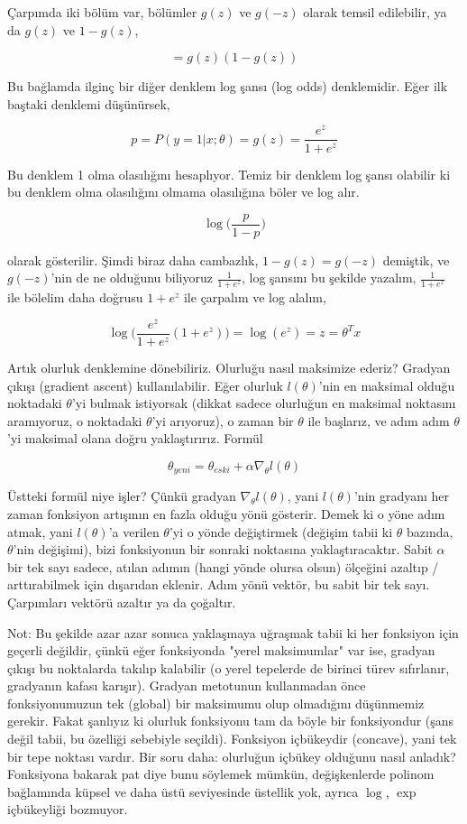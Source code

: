 \documentclass[12pt,fleqn]{article}\usepackage{../../common}
\begin{document}
Çarpımda iki bölüm var, bölümler $g(z)$ ve $g(-z)$ olarak temsil edilebilir, ya
da $g(z)$ ve $1-g(z)$,

$$
 = g(z)(1-g(z))
$$

Bu bağlamda ilginç bir diğer denklem log şansı (log odds) denklemidir. Eğer ilk
baştaki denklemi düşünürsek,

$$ p = P(y=1|x;\theta) = g(z) = \frac{e^{z}}{1+e^{z}}  $$

Bu denklem 1 olma olasılığını hesaplıyor. Temiz bir denklem log şansı olabilir
ki bu denklem olma olasılığını olmama olasılığına böler ve log alır.

$$ \log \bigg( \frac{p}{1-p} \bigg)$$

olarak gösterilir. Şimdi biraz daha cambazlık, $1 - g(z) = g(-z)$ demiştik, ve
$g(-z)$'nin de ne olduğunu biliyoruz $\frac{1}{1+e^{z}}$, log şansını bu şekilde
yazalım, $\frac{1}{1+e^{z}}$ ile bölelim daha doğrusu $1+e^{z}$ ile çarpalım ve
log alalım,

$$ 
\log \bigg( \frac{e^{z}}{1+e^{z}} (1+e^{z})  \bigg) 
= \log(e^{z}) 
= z = \theta^Tx
$$

Artık olurluk denklemine dönebiliriz. Olurluğu nasıl maksimize ederiz?  Gradyan
çıkışı (gradient ascent) kullanılabilir. Eğer olurluk $l(\theta)$'nin en
maksimal olduğu noktadaki $\theta$'yi bulmak istiyorsak (dikkat sadece olurluğun
en maksimal noktasını aramıyoruz, o noktadaki $\theta$'yi arıyoruz), o zaman bir
$\theta$ ile başlarız, ve adım adım $\theta$'yi maksimal olana doğru
yaklaştırırız. Formül

$$ \theta_{yeni} = \theta_{eski} + \alpha \nabla_\theta l(\theta)$$

Üstteki formül niye işler? Çünkü gradyan $\nabla_\theta l(\theta)$, yani
$l(\theta)$'nin gradyanı her zaman fonksiyon artışının en fazla olduğu yönü
gösterir. Demek ki o yöne adım atmak, yani $l(\theta)$'a verilen $\theta$'yi o
yönde değiştirmek (değişim tabii ki $\theta$ bazında, $\theta$'nin değişimi),
bizi fonksiyonun bir sonraki noktasına yaklaştıracaktır. Sabit $\alpha$ bir tek
sayı sadece, atılan adımın (hangi yönde olursa olsun) ölçeğini azaltıp /
arttırabilmek için dışarıdan eklenir. Adım yönü vektör, bu sabit bir tek
sayı. Çarpımları vektörü azaltır ya da çoğaltır.

Not: Bu şekilde azar azar sonuca yaklaşmaya uğraşmak tabii ki her fonksiyon için
geçerli değildir, çünkü eğer fonksiyonda "yerel maksimumlar" var ise, gradyan
çıkışı bu noktalarda takılıp kalabilir (o yerel tepelerde de birinci türev
sıfırlanır, gradyanın kafası karışır). Gradyan metotunun kullanmadan önce
fonksiyonumuzun tek (global) bir maksimumu olup olmadığını düşünmemiz
gerekir. Fakat şanlıyız ki olurluk fonksiyonu tam da böyle bir fonksiyondur
(şans değil tabii, bu özelliği sebebiyle seçildi). Fonksiyon içbükeydir
(concave), yani tek bir tepe noktası vardır. Bir soru daha: olurluğun içbükey
olduğunu nasıl anladık?  Fonksiyona bakarak pat diye bunu söylemek mümkün,
değişkenlerde polinom bağlamında küpsel ve daha üstü seviyesinde üstellik yok,
ayrıca $\log$, $\exp$ içbükeyliği bozmuyor.
\end{document}
